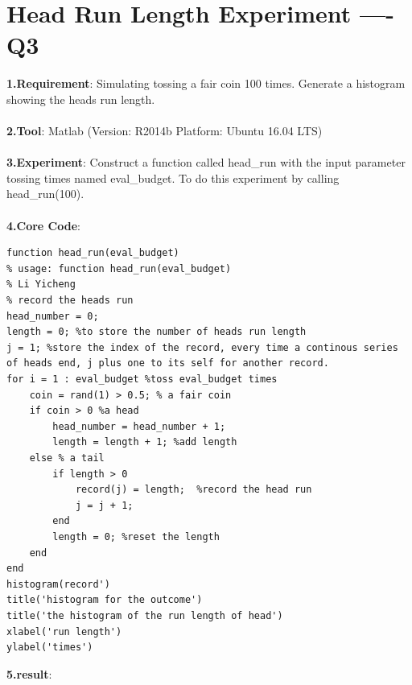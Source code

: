 \documentclass[twoside]{article}
\begin{document}
\section{Head Run Length Experiment ---- Q3}
\textbf{1.Requirement}: Simulating tossing a fair coin 100 times. Generate a histogram showing the heads run length.\\ \\
\textbf{2.Tool}: Matlab (Version: R2014b Platform: Ubuntu 16.04 LTS)\\ \\
\textbf{3.Experiment}: Construct a function called head\_run with the input parameter tossing times named eval\_budget. To do this experiment by calling head\_run(100).\\ \\
\textbf{4.Core Code}:\\
\begin{lstlisting}
function head_run(eval_budget)
% usage: function head_run(eval_budget)
% Li Yicheng
% record the heads run 
head_number = 0;
length = 0; %to store the number of heads run length
j = 1; %store the index of the record, every time a continous series of heads end, j plus one to its self for another record.
for i = 1 : eval_budget %toss eval_budget times
    coin = rand(1) > 0.5; % a fair coin
    if coin > 0 %a head
        head_number = head_number + 1;
        length = length + 1; %add length
    else % a tail
        if length > 0
            record(j) = length;  %record the head run
            j = j + 1;
        end
        length = 0; %reset the length
    end
end
histogram(record')
title('histogram for the outcome')
title('the histogram of the run length of head')
xlabel('run length')
ylabel('times')
\end{lstlisting}
\textbf{5.result}: \\
\end{document}
